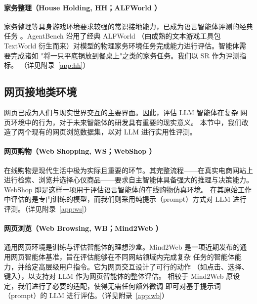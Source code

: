 \paragraph{家务整理（House Holding, HH；ALFWorld \citep{shridhar2020b}）}
家务整理等具身游戏环境要求较强的常识接地能力，已成为语言智能体评测的经典
任务 \citep{cote2019}。AgentBench 沿用了经典 ALFWorld
\citep{shridhar2020b}（由成熟的文本游戏工具包 TextWorld \citep{cote2019}
衍生而来）对模型的物理家务环境任务完成能力进行评估。智能体需要完成诸如
"将一只平底锅放到餐桌上"之类的家务任务。我们以 SR 作为评测指标。
（详见附录~\ref{app:hh}）

\subsection{网页接地类环境}

网页已成为人们与现实世界交互的主要界面。因此，评估 LLM 智能体在复杂
网页环境中的行为，对于未来智能体的研发具有重要的现实意义。
本节中，我们改造了两个现有的网页浏览数据集，以对 LLM 进行实用性评测。

\paragraph{网页购物（Web Shopping, WS；WebShop \citep{yao2022}）}
在线购物是现代生活中极为实际且重要的环节。其完整流程——在真实电商网站上
进行检索、浏览并选择心仪商品——要求自主智能体具备强大的推理与决策能力。
WebShop \citep{yao2022} 即是这样一项用于评估语言智能体的在线购物仿真环境。
在其原始工作中评估的是专门训练的模型，而我们则采用纯提示（prompt）方式对
LLM 进行评测。（详见附录~\ref{app:ws}）

\paragraph{网页浏览（Web Browsing, WB；Mind2Web \citep{deng2023}）}
通用网页环境是训练与评估智能体的理想沙盒。Mind2Web \citep{deng2023}
是一项近期发布的通用网页智能体基准，旨在评估能够在不同网站领域内完成复杂
任务的智能体能力，并给定高层级用户指令。它为网页交互设计了可行的动作
（如点击、选择、键入），以支持对 LLM 作为网页智能体的整体评估。
相较于 Mind2Web 原设定，我们进行了必要的适配，使得无需任何额外微调
即可对基于提示词（prompt）的 LLM 进行评估。（详见附录~\ref{app:wb}）
